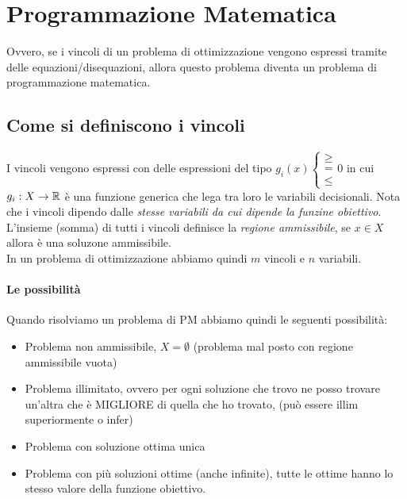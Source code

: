 \documentclass[12pt, a4paper, openany]{book}
\begin{document}
\section{Programmazione Matematica}
Ovvero, se i vincoli di un problema di ottimizzazione vengono espressi tramite delle equazioni/disequazioni, allora questo problema diventa un problema di programmazione matematica.

\subsection*{Come si definiscono i vincoli}
I vincoli vengono espressi con delle espressioni del tipo $g_i(x) \begin{cases}
    \geq \\ = \\ \leq %
\end{cases} 0$
in cui $g_i: X\to \mathbb{R}$ è una funzione generica che lega tra loro le variabili decisionali.
Nota che i vincoli dipendo dalle \emph{stesse variabili da cui dipende la funzine obiettivo}.
\\L'insieme (somma) di tutti i vincoli definisce la \emph{regione ammissibile}, se $x \in X$ allora è una soluzone ammissibile.
\\In un problema di ottimizzazione abbiamo quindi $m$ vincoli e $n$ variabili.

\paragraph*{Le possibilità} Quando risolviamo un problema di PM abbiamo quindi le seguenti possibilità:
\begin{itemize}
    \item Problema non ammissibile, $X = \emptyset$ (problema mal posto con regione ammissibile vuota)
    \item Problema illimitato, ovvero per ogni soluzione che trovo ne posso trovare un'altra che è MIGLIORE di quella che ho trovato, (può essere illim superiormente o infer)
    \item Problema con soluzione ottima unica
    \item Problema con più soluzioni ottime (anche infinite), tutte le ottime hanno lo stesso valore della funzione obiettivo.
\end{itemize}
\end{document}
